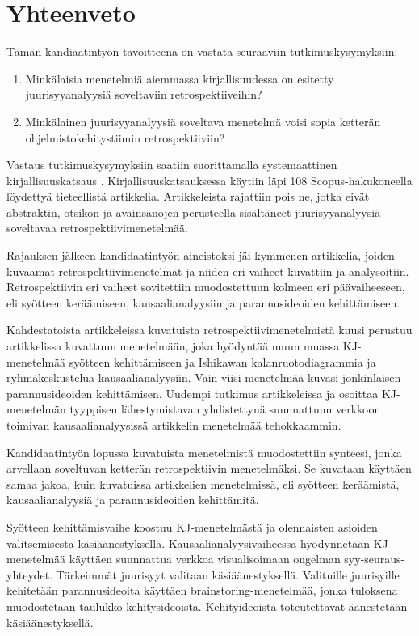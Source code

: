 \section{Yhteenveto}
Tämän kandiaatintyön tavoitteena on vastata seuraaviin tutkimuskysymyksiin:
\begin{enumerate}
\item Minkälaisia menetelmiä aiemmassa kirjallisuudessa on esitetty juurisyyanalyysiä soveltaviin retrospektiiveihin?
\item Minkälainen juurisyyanalyysiä soveltava menetelmä voisi sopia ketterän ohjelmistokehitystiimin retrospektiiviin?
\end{enumerate}
Vastaus tutkimuskysymyksiin saatiin suorittamalla systemaattinen kirjallisuuskatsaus \citep{Kitchenham2007}. Kirjallisuuskatsauksessa käytiin läpi 108 Scopus-hakukoneella löydettyä tieteellistä artikkelia. Artikkeleista rajattiin pois ne, jotka eivät abstraktin, otsikon ja avainsanojen perusteella sisältäneet juurisyyanalyysiä soveltavaa retrospektiivimenetelmää.

Rajauksen jälkeen kandidaatintyön aineistoksi jäi kymmenen artikkelia, joiden kuvaamat retrospektiivimenetelmät ja niiden eri vaiheet kuvattiin ja analysoitiin. Retrospektiivin eri vaiheet sovitettiin muodostettuun kolmeen eri päävaiheeseen, eli syötteen keräämiseen, kausaalianalyysiin ja parannusideoiden kehittämiseen. 

Kahdestatoista artikkeleissa kuvatuista retrospektiivimenetelmistä kuusi perustuu artikkelissa \citep{birk2002postmortem} kuvattuun menetelmään, joka hyödyntää muun muassa KJ-menetelmää syötteen kehittämiseen ja Ishikawan kalanruotodiagrammia ja ryhmäkeskustelua kausaalianalyysiin. Vain viisi menetelmää kuvasi jonkinlaisen parannusideoiden kehittämisen. Uudempi tutkimus artikkeleissa \citep{Bjornson2009} ja \citep{Lehtinen2011} osoittaa KJ-menetelmän tyyppisen lähestymistavan yhdistettynä suunnattuun verkkoon toimivan kausaalianalyysissä artikkelin \citep{birk2002postmortem} menetelmää tehokkaammin.

Kandidaatintyön lopussa kuvatuista menetelmistä muodostettiin synteesi, jonka arvellaan soveltuvan ketterän retrospektiivin menetelmäksi. Se kuvataan käyttäen samaa jakoa, kuin kuvatuissa artikkelien menetelmissä, eli syötteen keräämistä, kausaalianalyysiä ja parannusideoiden kehittämitä.
 
Syötteen kehittämisvaihe koostuu KJ-menetelmästä ja olennaisten asioiden valitsemisesta käsiäänestyksellä. Kausaalianalyysivaiheessa hyödynnetään KJ-menetelmää käyttäen suunnattua verkkoa visualisoimaan ongelman syy-seuraus-yhteydet. Tärkeimmät juurisyyt valitaan käsiäänestyksellä. Valituille juurisyille kehitetään parannusideoita käyttäen brainstoring-menetelmää, jonka tuloksena muodostetaan taulukko kehitysideoista. Kehityideoista toteutettavat äänestetään käsiäänestyksellä.

